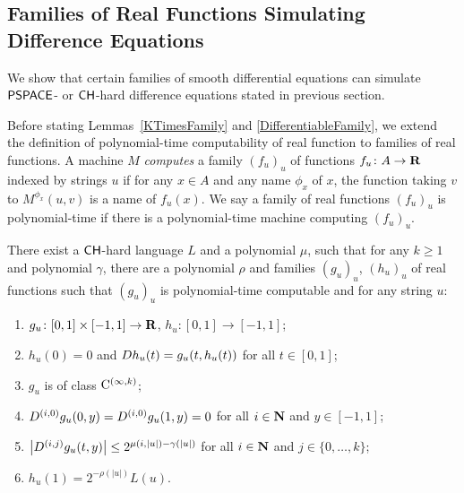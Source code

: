 


\subsection{Families of Real Functions Simulating Difference Equations}
\label{subsection: ode family}
We show that certain families of smooth differential equations can simulate 
$\mathsf{PSPACE}$- or $\mathsf{CH}$-hard difference equations stated in previous section.

Before stating Lemmas~\ref{KTimesFamily} and \ref{DifferentiableFamily},
we extend the definition of polynomial-time computability of real function
to families of real functions.
A machine $M$ \emph{computes} a family $(f_u)_u$ of functions $f _u \colon A \to \mathbf R$ 
indexed by strings $u$
if for any $x \in A$ and any name $\phi_x$ of $x$,
the function taking $v$ to $M ^{\phi _x} (u, v)$ is a name of $f _u (x)$.
We say a family of real functions $(f_u)_u$ is polynomial-time if there is
a polynomial-time machine computing $(f_u)_u$.

 \begin{lemma}
  \label{KTimesFamily}
  There exist a $\mathsf{CH}$-hard language $L$ and a polynomial $\mu$,
  such that for any $k \ge 1$ and polynomial $\gamma$,
  there are a polynomial $\rho$ and families $(g_u)_u$, $(h_u)_u$ of real functions
  such that $(g_u)_u$ is polynomial-time computable and for any string $u$:
  \begin{enumerate}
   \item \label{enum:kf:start}
	 $g_u\colon [0,1] \times [-1,1]\to \mathbf R$, $h_u\colon [0,1] \to [-1,1]$;
   \item \label{enum:equation}
	 $h_u(0) = 0$ and $D h_u(t) = g_u(t, h_u(t))$ for all $t \in [0,1]$;
   \item \label{enum:differentiability}
         $g_u$ is of class $\mathrm C^{(\infty, k)}$;
   \item \label{enum:boundary}
	 $
	 D^{(i, 0)} g_u(0,y) = D^{(i, 0)} g_u(1,y) = 0
         $ for all $i \in \mathbf N$ and $y \in [-1,1]$;
   \item \label{enum:smooth}
	 $
	 \left|D^{(i,j)} g_u(t,y)\right| \le 2^{\mu(i, |u|) - \gamma(|u|)}
         $ for all $i \in \mathbf N$ and $j \in \{0, \dots, k\}$;
   \item \label{enum:kf:end}
	 $h_u(1) = 2^{-\rho(|u|)} L(u)$.
  \end{enumerate}
 \end{lemma}

